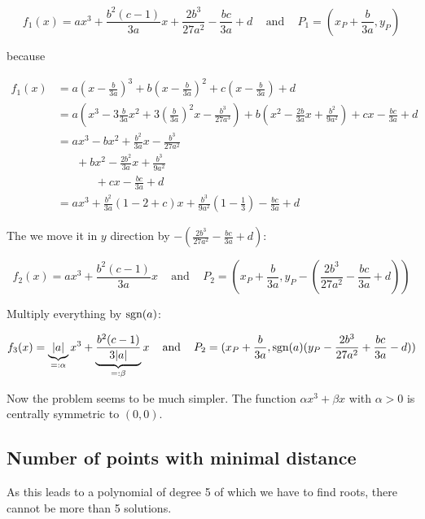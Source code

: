 \[f_1(x) = ax^3 + \frac{b^2 (c-1)}{3a} x + \frac{2b^3}{27 a^2} - \frac{bc}{3a} + d \;\;\;\text{ and }\;\;\;P_1 = (x_P + \frac{b}{3a}, y_P)\]

because

\begin{align}
    f_1(x) &= a \left (x - \frac{b}{3a} \right )^3 + b \left (x-\frac{b}{3a} \right )^2 + c \left (x-\frac{b}{3a} \right ) + d\\
           &= a \left (x^3 - 3 \frac{b}{3a}x^2 + 3 (\frac{b}{3a})^2 x - \frac{b^3}{27a^3} \right )
             +b \left (x^2 - \frac{2b}{3a} x + \frac{b^2}{9a^2} \right )
             +c x - \frac{bc}{3a} + d\\
            &= ax^3 - bx^2 + \frac{b^2}{3a}x - \frac{b^3}{27 a^2}\\
            & \;\;\;\;\;\;+ bx^2 - \frac{2b^2}{3a}x + \frac{b^3}{9a^2}\\
            & \;\;\;\;\;\;\;\;\;\;\;\; + c x - \frac{bc}{3a} + d\\
            &= ax^3 + \frac{b^2}{3a}\left (1-2+c \right )x + \frac{b^3}{9a^2} \left (1-\frac{1}{3} \right )- \frac{bc}{3a} + d
\end{align}

The we move it in $y$ direction by $- (\frac{2b^3}{27 a^2} - \frac{bc}{3a} + d)$:

\[f_2(x) = ax^3 + \frac{b^2 (c-1)}{3a} x \;\;\;\text{ and }\;\;\;P_2 = (x_P + \frac{b}{3a}, y_P - (\frac{2b^3}{27 a^2} - \frac{bc}{3a} + d))\]

Multiply everything by $\text{sgn}(a)$:

\[f_3(x) = \underbrace{|a|}_{=: \alpha}x^3 + \underbrace{\frac{b^2 (c-1)}{3|a|}}_{=: \beta} x \;\;\;\text{ and }\;\;\;P_2 = (x_P + \frac{b}{3a}, \text{sgn}(a) (y_P - \frac{2b^3}{27 a^2} + \frac{bc}{3a} - d))\]

Now the problem seems to be much simpler. The function $\alpha x^3 + \beta x$
with $\alpha > 0$ is centrally symmetric to $(0, 0)$.


\subsection{Number of points with minimal distance}
As this leads to a polynomial of degree 5 of which we have to find
roots, there cannot be more than 5 solutions.


